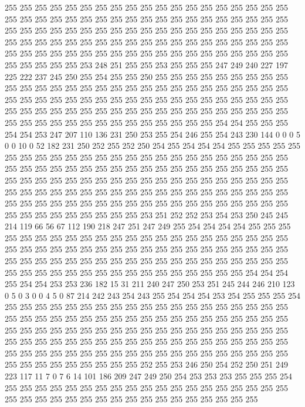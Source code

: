 255 255 255 255 255 255 255 255 255 255 255 255 255 255 255 255 255 255 255 255
255 255 255 255 255 255 255 255 255 255 255 255 255 255 255 255 255 255 255 255
255 255 255 255 255 255 255 255 255 255 255 255 255 255 255 255 255 255 255 255
255 255 255 255 255 255 255 255 255 255 255 255 255 255 255 255 255 255 255 255
255 255 255 255 255 255 255 255 255 255 255 255 255 255 255 255 255 255 255 255
253 248 251 255 255 253 255 255 255 247 249 240 227 197 225 222 237 245 250 255
254 255 255 250 255 255 255 255 255 255 255 255 255 255 255 255 255 255 255 255
255 255 255 255 255 255 255 255 255 255 255 255 255 255 255 255 255 255 255 255
255 255 255 255 255 255 255 255 255 255 255 255 255 255 255 255 255 255 255 255
255 255 255 255 255 255 255 255 255 255 255 255 255 255 255 255 255 255 255 255
255 255 255 255 254 254 255 255 255 254 254 253 247 207 110 136 231 250 253 255
254 246 255 254 243 230 144 0 0 0 5 0 0 10 0 52 182 231 250 252
255 252 250 254 255 254 254 254 255 255 255 255 255 255 255 255 255 255 255 255
255 255 255 255 255 255 255 255 255 255 255 255 255 255 255 255 255 255 255 255
255 255 255 255 255 255 255 255 255 255 255 255 255 255 255 255 255 255 255 255
255 255 255 255 255 255 255 255 255 255 255 255 255 255 255 255 255 255 255 255
255 255 255 255 255 255 255 255 255 255 255 255 255 255 255 255 255 255 255 255
255 255 255 255 255 255 255 255 255 255 255 255 255 255 255 255 255 253 251 252
252 253 254 253 250 245 245 214 119 66 56 67 112 190 218 247 251 247 249 255
254 254 254 254 255 255 255 255 255 255 255 255 255 255 255 255 255 255 255 255
255 255 255 255 255 255 255 255 255 255 255 255 255 255 255 255 255 255 255 255
255 255 255 255 255 255 255 255 255 255 255 255 255 255 255 255 255 255 255 255
255 255 255 255 255 255 255 255 255 255 255 255 255 255 255 255 255 255 255 255
254 254 254 255 254 254 253 253 236 182 15 31 211 240 247 250 253 251 245 244
246 210 123 0 5 0 3 0 0 4 5 0 87 214 242 243 254 243 255 254
254 254 253 254 255 255 255 254 255 255 255 255 255 255 255 255 255 255 255 255
255 255 255 255 255 255 255 255 255 255 255 255 255 255 255 255 255 255 255 255
255 255 255 255 255 255 255 255 255 255 255 255 255 255 255 255 255 255 255 255
255 255 255 255 255 255 255 255 255 255 255 255 255 255 255 255 255 255 255 255
255 255 255 255 255 255 255 255 255 255 255 255 255 255 255 255 255 255 255 255
255 255 255 255 255 255 255 255 255 255 255 255 252 255 253 246 250 254 252 250
251 249 223 117 11 7 0 7 6 14 101 186 209 247 249 250 254 253 253 253
255 255 255 254 255 255 255 255 255 255 255 255 255 255 255 255 255 255 255 255
255 255 255 255 255 255 255 255 255 255 255 255 255 255 255 255 255 255 255 255
